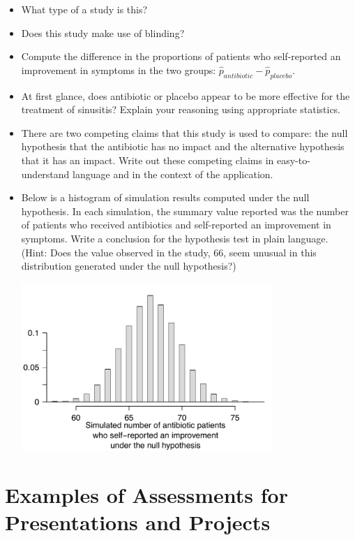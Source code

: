 \begin{itemize}
\item What type of a study is this?
\item Does this study make use of blinding?
\item Compute the difference in the proportions of patients who self-reported an improvement in symptoms in the two groups: $\hat{p}_{antibiotic} - \hat{p}_{placebo}$.
\item At first glance, does antibiotic or placebo appear to be more effective for the treatment of sinusitis? Explain your reasoning using appropriate statistics.
\item There are two competing claims that this study is used to compare: the null hypothesis that the antibiotic has no impact and the alternative hypothesis that it has an impact. Write out these competing claims in easy-to-understand language and in the context of the application.
\item Below is a histogram of simulation results computed under the null hypothesis. In each simulation, the summary value reported was the number of patients who received antibiotics and self-reported an improvement in symptoms. Write a conclusion for the hypothesis test in plain language. (Hint: Does the value observed in the study, 66, seem unusual in this distribution generated under the null hypothesis?)
\begin{center}
\includegraphics[width = 0.75\textwidth]{includes/sinusitis}
\end{center}
\end{itemize}





\section{\textbf{Examples of Assessments for Presentations and Projects}}

